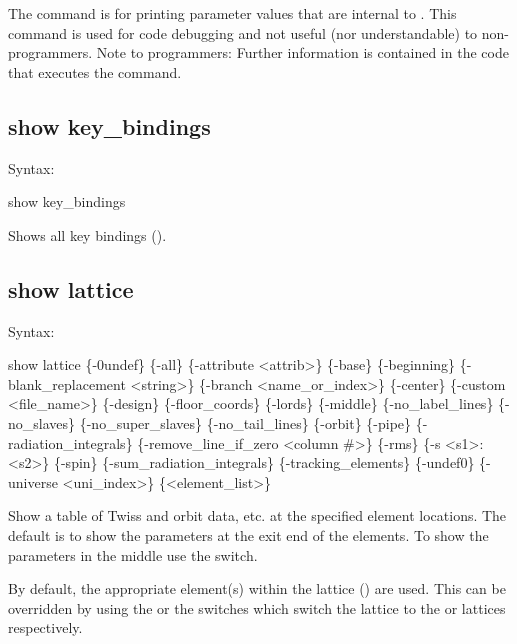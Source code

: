 {{{{{{{{The  command is for printing parameter values that are internal to \tao. This
command is used for code debugging and not useful (nor understandable) to non-programmers. Note to
programmers: Further information is contained in the code that executes the 
command.


\subsection{show key_bindings}
\label{s:show.key}

Syntax:
\begin{example}
  show key_bindings
\end{example}

Shows all key bindings ().


\subsection{show lattice}
\label{s:show.lattice}

Syntax:
\begin{example}
  show lattice \{-0undef\} \{-all\} \{-attribute <attrib>\} \{-base\} \{-beginning\}
      \{-blank_replacement <string>\}  \{-branch <name_or_index>\} \{-center\}
      \{-custom <file_name>\} \{-design\} \{-floor_coords\} \{-lords\} \{-middle\}
      \{-no_label_lines\} \{-no_slaves\} \{-no_super_slaves\} \{-no_tail_lines\} \{-orbit\} 
      \{-pipe\} \{-radiation_integrals\} \{-remove_line_if_zero <column \#>\} 
      \{-rms\} \{-s <s1>:<s2>\} \{-spin\} \{-sum_radiation_integrals\} \{-tracking_elements\} 
      \{-undef0\} \{-universe <uni_index>\} \{<element_list>\} 
\end{example}

Show a table of Twiss and orbit data, etc. at the specified element locations. The default is to
show the parameters at the exit end of the elements. To show the parameters in the middle use the
 switch.

By default, the appropriate element(s) within the  lattice () are
used. This can be overridden by using the  or the  switches which switch the
lattice to the  or  lattices respectively.

}}}}}}}}
